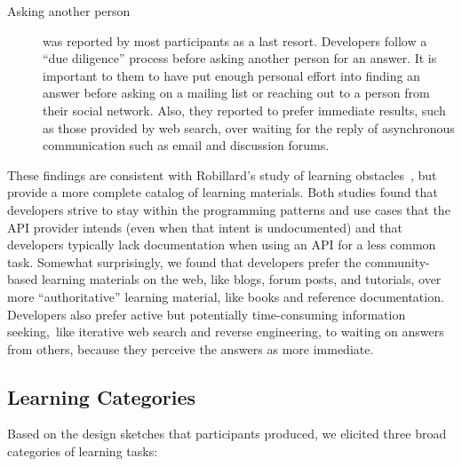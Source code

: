 \begin{description}
\item[Asking another person] was reported by most participants as a last resort. Developers follow a ``due diligence'' process before asking another person for an answer. It is important to them to have put enough personal effort into finding an answer before asking on a mailing list or reaching out to a person from their social network. 
Also, they reported to prefer immediate results, such as those provided by web search, over waiting for the reply of asynchronous communication such as email and discussion forums.

\end{description}

These findings are consistent with Robillard's study of learning obstacles~\cite{robillard09}, but provide a more complete catalog of learning materials. Both studies found that developers strive to stay within the programming patterns and use cases that the API provider intends (even when that intent is undocumented) and that developers typically lack documentation when using an API for a less common task. Somewhat surprisingly, we found that developers prefer the community-based learning materials on the web, like blogs, forum posts, and tutorials, over more ``authoritative'' learning material, like books and reference documentation. Developers also prefer active but potentially time-consuming information seeking,~like iterative web search and reverse engineering, to waiting on answers from others, because they perceive the answers as more immediate.

\moarsauce
\subsection{Learning Categories}


Based on the design sketches that participants produced, we elicited three broad categories of learning tasks:


